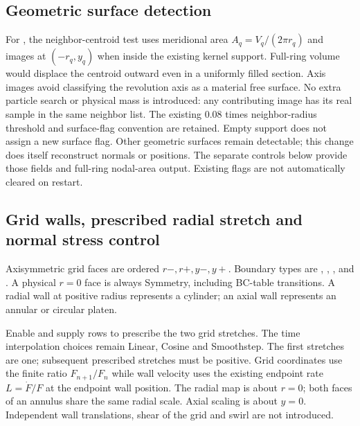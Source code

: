 \subsection{Geometric surface detection}
For , the neighbor-centroid test uses meridional
area $A_q=V_q/(2\pi r_q)$ and images at $(-r_q,y_q)$ when inside the existing
kernel support. Full-ring volume would displace the centroid outward even
in a uniformly filled section. Axis images avoid classifying the revolution
axis as a material free surface. No extra particle search or physical mass
is introduced: any contributing image has its real sample in the same
neighbor list. The existing $0.08$ times neighbor-radius threshold and
surface-flag convention are retained. Empty support does not assign a new
surface flag. Other geometric surfaces remain detectable; this change does
itself reconstruct normals or positions. The separate controls below provide
those fields and full-ring nodal-area output.
Existing flags are not automatically cleared on restart.

\subsection{Grid walls, prescribed radial stretch and normal stress control}
\label{sec:axisymmetric-grid-driving}
Axisymmetric grid faces are ordered $r-,r+,y-,y+$. Boundary types are
, , , and
. A physical $r=0$ face is always Symmetry, including
BC-table transitions. A radial wall at positive radius represents a cylinder;
an axial wall represents an annular or circular platen.

Enable  and supply
 rows  to prescribe the two grid
stretches. The time interpolation choices remain Linear, Cosine and Smoothstep.
The first stretches are one; subsequent prescribed stretches must be positive.
Grid coordinates use the finite ratio $F_{n+1}/F_n$ while wall velocity uses
the existing endpoint rate $L=\dot F/F$ at the endpoint wall position.
The radial map is about $r=0$; both faces of an annulus share the same radial
scale. Axial scaling is about $y=0$. Independent wall translations, shear of
the grid and swirl are not introduced.


